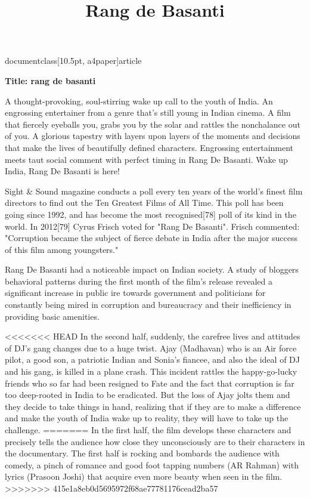 documentclass[10.5pt, a4paper]{article}
\usepackage{amsfonts}
\usepackage[top=1in,left=1in,right=1in]{geometry}
\usepackage{times}
\usepackage{tabularx}
\usepackage{graphicx}
\title{Rang de Basanti}

\maketitle
\textbf{Title: rang de basanti}

A thought-provoking, soul-stirring wake up call to the youth of India. An engrossing entertainer from a genre
 that's still young in Indian cinema. A film that fiercely eyeballs you, grabs you by the solar and rattles the
 nonchalance out of you. A glorious tapestry with layers upon layers of the moments and decisions that make the
 lives of beautifully defined characters. Engrossing entertainment meets taut social comment with perfect timing
 in Rang De Basanti. Wake up India, Rang De Basanti is here!

Sight & Sound magazine conducts a poll every ten years of the world's finest film directors to find out the Ten Greatest Films of All Time. This poll has been going since 1992, and has become the most recognised[78] poll of its kind in the world. In 2012[79] Cyrus Frisch voted for "Rang De Basanti". Frisch commented: "Corruption became the subject of fierce debate in India after the major success of this film among youngsters."

Rang De Basanti had a noticeable impact on Indian society. A study of bloggers behavioral patterns during the first month of the film's release revealed a significant increase in public ire towards government and politicians for constantly being mired in corruption and bureaucracy and their inefficiency in providing basic amenities. 

<<<<<<< HEAD
In the second half, suddenly, the carefree lives and attitudes of DJ's gang changes due to a huge twist. 
Ajay (Madhavan) who is an Air force pilot, a good son, a patriotic Indian and Sonia's fiancee, and also 
the ideal of DJ and his gang, is killed in a plane crash. This incident rattles the happy-go-lucky friends 
who so far had been resigned to Fate and the fact that corruption is far too deep-rooted in India to be eradicated. 
But the loss of Ajay jolts them and they decide to take things in hand, realizing that 
if they are to make a difference and make the youth of India wake up to reality, they will have to take up the challenge.
=======
In the first half, the film develops these characters and precisely tells the audience how close they unconsciously are to their characters in the documentary. The first half is rocking and bombards the audience with comedy, a pinch of romance and good foot tapping numbers (AR Rahman) with lyrics (Prasoon Joshi) that acquire even more beauty when seen in the film.
>>>>>>> 415e1a8eb0d5695972f68ae77781176cead2ba57

